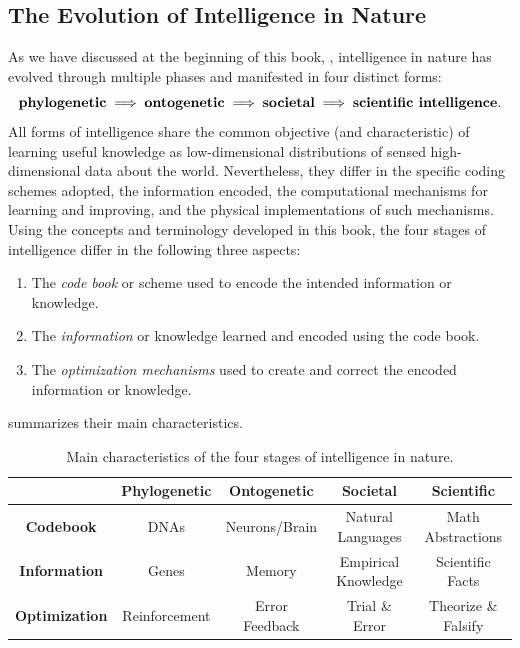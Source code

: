 \documentclass[../../book-main.tex]{subfiles}
\begin{document}
\subsection{The Evolution of Intelligence in Nature}
As we have discussed at the beginning of this book, ,
intelligence in nature has evolved through multiple phases and
manifested in four distinct forms:
\begin{equation}
    \text{\textbf{phylogenetic}} \;
    \Longrightarrow \; \text{\textbf{ontogenetic}} \;
    \Longrightarrow \; \text{\textbf{societal}} \;
    \Longrightarrow \; \text{\textbf{scientific intelligence}}.
\end{equation}
All forms of intelligence share the common objective (and
characteristic) of learning useful knowledge as low-dimensional
distributions of sensed high-dimensional data about the world.
Nevertheless, they differ in the specific coding schemes adopted, the
information encoded, the computational mechanisms for learning and
improving, and the physical implementations of such mechanisms. Using
the concepts and terminology developed in this book, the four stages
of intelligence differ in the following three aspects:
\begin{enumerate}
    \item The \textit{code book} or scheme used to encode the
        intended information or knowledge.
    \item The \textit{information} or knowledge learned and encoded
        using the code book.
    \item The \textit{optimization mechanisms} used to create and
        correct the encoded information or knowledge.
\end{enumerate}
 summarizes their main characteristics.
\begin{table}[h]
    \centering
    \resizebox{1\columnwidth}{!}
    {
        \begin{tabular}{| c | c | c | c | c |}
            \hline & \textbf{Phylogenetic} & \textbf{Ontogenetic} &
            \textbf{Societal} & \textbf{Scientific}\\
            \hline

            \textbf{Codebook}  & DNAs & Neurons/Brain & Natural
            Languages & Math Abstractions \\ [0.5ex]
            \hline

            \textbf{Information} & Genes & Memory & Empirical
            Knowledge & Scientific Facts\\ [0.5ex]
            \hline
            \textbf{Optimization} & Reinforcement & Error Feedback &
            Trial \& Error & Theorize \& Falsify \\  [0.5ex]
            \hline
        \end{tabular}
    }
    \caption{Main characteristics of the four stages of intelligence in nature.}
    \label{tab:four-stage-intelligence}
\end{table}
\end{document}
